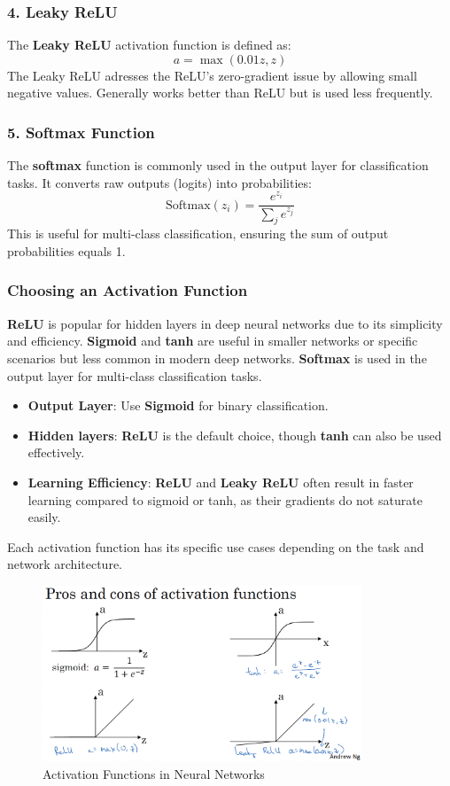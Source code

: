 \documentclass[letterpaper,12pt,notitlepage,twoside]{report}
\begin{document}
\subsubsection{4. Leaky ReLU}
The \textbf{Leaky ReLU} activation function is defined as:
\[
a = \max(0.01z, z)
\]
The Leaky ReLU adresses the ReLU's zero-gradient issue by allowing small negative values. Generally works better than ReLU but is used less frequently.

\subsubsection{5. Softmax Function}
The \textbf{softmax} function is commonly used in the output layer for classification tasks. It converts raw outputs (logits) into probabilities:
\[
\text{Softmax}(z_i) = \frac{e^{z_i}}{\sum_{j}e^{z_j}}
\]
This is useful for multi-class classification, ensuring the sum of output probabilities equals 1.

\subsubsection{Choosing an Activation Function}
\textbf{ReLU} is popular for hidden layers in deep neural networks due to its simplicity and efficiency.  \textbf{Sigmoid} and \textbf{tanh} are useful in smaller networks or specific scenarios but less common in modern deep networks.  \textbf{Softmax} is used in the output layer for multi-class classification tasks.
\begin{itemize}
    \item \textbf{Output Layer}: Use \textbf{Sigmoid} for binary classification.
    \item \textbf{Hidden layers}: \textbf{ReLU} is the default choice, though \textbf{tanh} can also be used effectively.
    \item \textbf{Learning Efficiency}: \textbf{ReLU} and \textbf{Leaky ReLU} often result in faster learning compared to sigmoid or tanh, as their gradients do not saturate easily.
\end{itemize}

Each activation function has its specific use cases depending on the task and network architecture.

\begin{figure}[h]
	\centering
	\includegraphics[width=0.85\textwidth]{Images/Activation functions.png}
	\caption{Activation Functions in Neural Networks}
	\label{fig:15}
\end{figure}
\FloatBarrier
\end{document}
